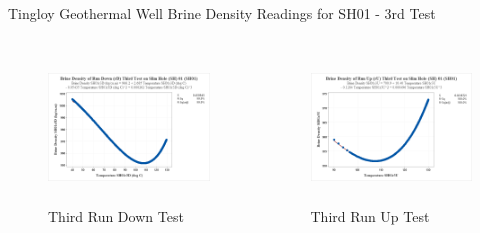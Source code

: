 \begin{frame}{Tingloy Geothermal Well Brine Density Readings for SH01 - 3rd Test\cite{halcon2015detailed}}
    \begin{columns}
    \begin{figure}
        \centering
        \caption{\centering Third Run Down Test}
        \includegraphics[height=4cm]{images/sh01r3d.png}
    \end{figure}
    \begin{figure}
        \centering
        \caption{\centering Third Run Up Test}
        \includegraphics[height=4cm]{images/sh01r3u.png}
    \end{figure}
    \end{columns}
\end{frame}

